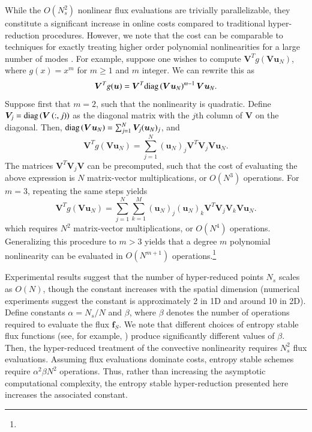 \documentclass[preprint,10pt]{elsarticle}
\theoremstyle{definition}
\theoremstyle{lemma}
\theoremstyle{theorem}
\theoremstyle{assumption}
\newcommand{\diag}[1]{{\rm diag}\LRp{#1}}
\newcommand{\LRp}[1]{\left( #1 \right)}
\newcommand{\bnote}[1]{{\color{blue}{#1}}}
\begin{document}
While the $O(N_s^2)$ nonlinear flux evaluations are trivially parallelizable, they constitute a significant increase in online costs compared to traditional hyper-reduction procedures.  However, we note that the cost can be comparable to techniques for exactly treating higher order polynomial nonlinearities for a large number of modes \cite{maboudi2018conservative}.  For example, suppose one wishes to compute $\bm{V}^T g\LRp{\bm{V}\bm{u}_N}$, where $g(x) = x^m$ for $m \geq 1$ and $m$ integer.  We can rewrite this as
\[
\bm{V}^T g(\bm{u}) = \bm{V}^T \diag{\bm{V}\bm{u}_N}^{m-1} \bm{V}\bm{u}_N.
\]
Suppose first that $m = 2$, such that the nonlinearity is quadratic.  Define $\bm{V}_j = \diag{\bm{V}\LRp{:,j}}$ as the diagonal matrix with the $j$th column of $\bm{V}$ on the diagonal.  Then, $\diag{\bm{V}\bm{u}_N} = \sum_{j=1}^N\bm{V}_j (\bm{u}_N)_j$, and 
\[
\bm{V}^T g\LRp{\bm{V}\bm{u}_N} = \sum_{j=1}^N (\bm{u}_N)_j \bm{V}^T \bm{V}_j \bm{V}\bm{u}_N.
\]
The matrices $\bm{V}^T \bm{V}_j \bm{V}$ can be precomputed, such that the cost of evaluating the above expression is $N$ matrix-vector multiplications, or $O(N^3)$ operations.  For $m = 3$, repeating the same steps yields
\[
\bm{V}^T g\LRp{\bm{V}\bm{u}_N} = \sum_{j=1}^N \sum_{k=1}^M (\bm{u}_N)_j  (\bm{u}_N)_k \bm{V}^T \bm{V}_j \bm{V}_k \bm{V}\bm{u}_N.
\]
which requires $N^2$ matrix-vector multiplications, or $O(N^4)$ operations.  Generalizing this procedure to $m > 3$ yields that a degree $m$ polynomial nonlinearity can be evaluated in $O(N^{m+1})$ operations.\footnote{\bnote{Because entropy conservative fluxes for the compressible Euler equations include non-polynomial rational and logarithmic terms, it is not possible to apply this exact treatment of polynomial nonlinearities to general entropy conservative discretizations. }}   

Experimental results suggest that the number of hyper-reduced points $N_s$ scales as $O(N)$, though the constant increases with the spatial dimension (numerical experiments suggest the constant is approximately 2 in 1D and around 10 in 2D).  Define constants $\alpha = N_s/ N$ and $\beta$, where $\beta$ denotes the number of operations required to evaluate the flux $\bm{f}_S$.  We note that different choices of entropy stable flux functions (see, for example, \cite{ismail2009affordable, chandrashekar2013kinetic, hicken2018family}) produce significantly different values of $\beta$.  Then, the hyper-reduced treatment of the convective nonlinearity requires $N_s^2$ flux evaluations.  Assuming flux evaluations dominate costs, entropy stable schemes require $\alpha^2 \beta N^2$ operations.  Thus, rather than increasing the asymptotic computational complexity, the entropy stable hyper-reduction presented here increases the associated constant.  
\end{document}
